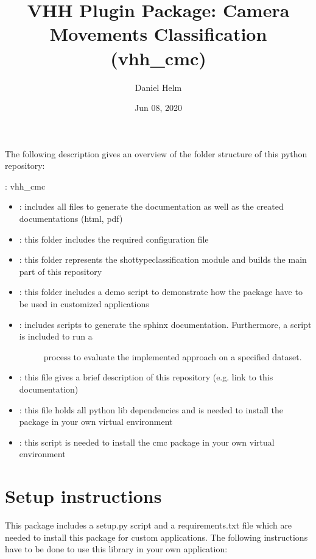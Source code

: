 \documentclass[letterpaper,10pt,english,openany,oneside]{sphinxmanual}
\title{VHH Plugin Package: Camera Movements Classification (vhh\_cmc)}
\date{Jun 08, 2020}
\author{Daniel Helm}
\begin{document}
\pagestyle{empty}
\sphinxmaketitle
\pagestyle{plain}
\sphinxtableofcontents
\pagestyle{normal}
\label{\detokenize{index::doc}}


The following description gives an overview of the folder structure of this python repository:

: vhh\_cmc
\begin{itemize}
\item {} 
: includes all files to generate the documentation as well as the created documentations (html, pdf)

\item {} 
: this folder includes the required configuration file

\item {} 
: this folder represents the shot\sphinxhyphen{}type\sphinxhyphen{}classification module and builds the main part of this repository

\item {} 
: this folder includes a demo script to demonstrate how the package have to be used in customized applications

\item {} \begin{description}
\item[{: includes scripts to generate the sphinx documentation. Furthermore, a script is included to run a}] \leavevmode
process to evaluate the implemented approach on a specified dataset.

\end{description}

\item {} 
: this file gives a brief description of this repository (e.g. link to this documentation)

\item {} 
: this file holds all python lib dependencies and is needed to install the package in your own virtual environment

\item {} 
: this script is needed to install the cmc package in your own virtual environment

\end{itemize}


\chapter{Setup  instructions}
\label{\detokenize{index:setup-instructions}}
This package includes a setup.py script and a requirements.txt file which are needed to install this package for custom
applications. The following instructions have to be done to use this library in your own application:
\end{document}
